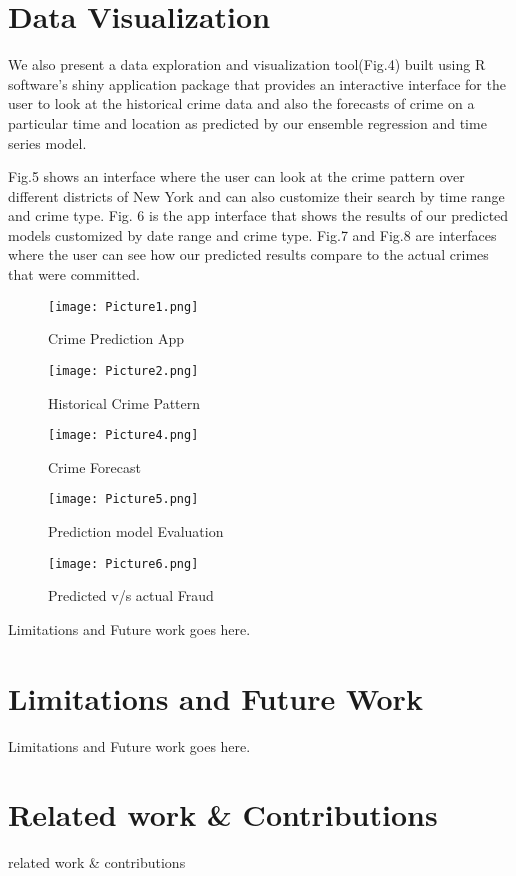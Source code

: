 \documentclass[10pt,journal,compsoc]{IEEEtran}
\begin{document}
\section{Data Visualization}
We also present a data exploration and visualization tool(Fig.4) built using R software's shiny application package that provides an interactive interface for the user to look at the historical crime data and also the forecasts of crime on a particular time and location as predicted by our ensemble regression and time series model.

Fig.5 shows an interface where the user can look at the crime pattern over different districts of New York and can also customize their search by time range and crime type. Fig. 6 is the app interface that shows the results of our predicted models customized by date range and crime type. Fig.7 and Fig.8 are interfaces where the user can see how our predicted results compare to the actual crimes that were committed.

\begin{figure}
\centering
  \texttt{[image: Picture1.png]}
  \caption{Crime Prediction App}
\end{figure}
\begin{figure}
\centering
  \texttt{[image: Picture2.png]}
  \caption{Historical Crime Pattern}
\end{figure}
\begin{figure}
\centering
  \texttt{[image: Picture4.png]}
  \caption{Crime Forecast}
\end{figure}
\begin{figure}
\centering
  \texttt{[image: Picture5.png]}
  \caption{Prediction model Evaluation}
\end{figure}
\begin{figure}
\centering
  \texttt{[image: Picture6.png]}
  \caption{Predicted v/s actual Fraud}
\end{figure}
Limitations and Future work goes here.

\section{Limitations and Future Work}
Limitations and Future work goes here.

\section{Related work \& Contributions}
related work \& contributions
\end{document}
